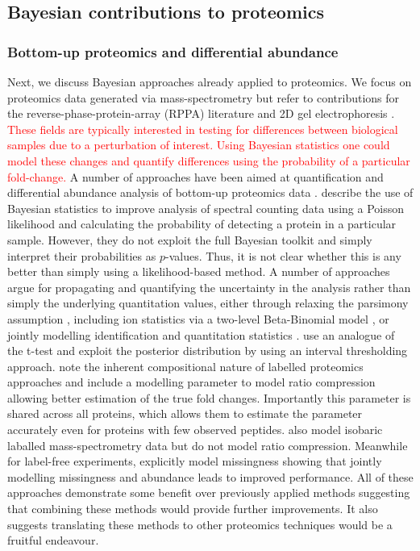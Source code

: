 \documentclass[12pt,english, journal=jpr, layout=twocolumn]{article}
\begin{document}
\subsection{Bayesian contributions to proteomics}
\subsubsection{Bottom-up proteomics and differential abundance}
Next, we discuss Bayesian approaches already applied to proteomics. We focus on proteomics data generated via mass-spectrometry but refer to contributions for the reverse-phase-protein-array (RPPA) literature \citep{Crook::2019, Ni::2019, Maity::2020} and 2D gel electrophoresis \citep{Morris::2011}. \textcolor{red}{These fields are typically interested in testing for differences between biological samples due to a perturbation of interest. Using Bayesian statistics one could model these changes and quantify differences using the probability of a particular fold-change.} A number of approaches have been aimed at quantification and differential abundance analysis of bottom-up proteomics data \citep{Phillips::2021, The::2021, The::2019, Santra::2016, Peshkin::2019, Millikin::2020, Serang::2013, OBrien::2018, Serang::2012, Carvalho::2011}. \citet{Carvalho::2011} describe the use of Bayesian statistics to improve analysis of spectral counting data using a Poisson likelihood and calculating the probability of detecting a protein in a particular sample. However, they do not exploit the full Bayesian toolkit and simply interpret their probabilities as $p$-values. Thus, it is not clear whether this is any better than simply using a likelihood-based method. A number of approaches \citep{The::2021, The::2019, Peshkin::2019, Serang::2012} argue for propagating and quantifying the uncertainty in the analysis rather than simply the underlying quantitation values, either through relaxing the parsimony assumption \citep{Serang::2012}, including ion statistics via a two-level Beta-Binomial model \citep{Peshkin::2019}, or jointly modelling identification and quantitation statistics \citep{The::2019, The::2021}. \citet{Millikin::2020} use an analogue of the t-test and exploit the posterior distribution by using an interval thresholding approach. \citet{OBrien::2018} note the inherent compositional nature of labelled proteomics approaches and include a modelling parameter to model ratio compression allowing better estimation of the true fold changes. Importantly this parameter is shared across all proteins, which allows them to estimate the parameter accurately even for proteins with few observed peptides. \citet{Jow::2014} also model isobaric laballed mass-spectrometry data but do not model ratio compression. Meanwhile for label-free experiments, \citet{OBrien::2018b} explicitly model missingness showing that jointly modelling missingness and abundance leads to improved performance. All of these approaches demonstrate some benefit over previously applied methods suggesting that combining these methods would provide further improvements. It also suggests translating these methods to other proteomics techniques would be a fruitful endeavour.
\end{document}
